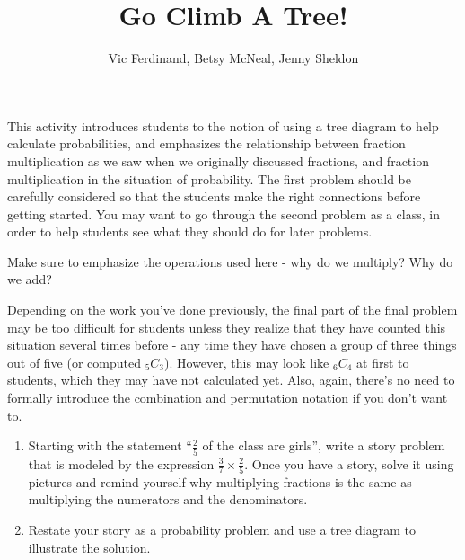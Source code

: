 \documentclass{ximera}
\title{Go Climb A Tree!}
\author{Vic Ferdinand, Betsy McNeal, Jenny Sheldon}
\begin{document}
\begin{abstract}
\end{abstract}
\maketitle

\begin{instructorIntro}
This activity introduces students to the notion of using a tree diagram to help calculate probabilities, and emphasizes the relationship between fraction multiplication as we saw when we originally discussed fractions, and fraction multiplication in the situation of probability.  The first problem should be carefully considered so that the students make the right connections before getting started.  You may want to go through the second problem as a class, in order to help students see what they should do for later problems.

Make sure to emphasize the operations used here - why do we multiply?  Why do we add?

Depending on the work you've done previously, the final part of the final problem may be too difficult for students unless they realize that they have counted this situation several times before - any time they have chosen a group of three things out of five (or computed $_5C_3$).  However, this may look like $_6C_4$ at first to students, which they may have not calculated yet.  Also, again, there's no need to formally introduce the combination and permutation notation if you don't want to.

\end{instructorIntro}

\begin{problem}
\begin{enumerate}
\item Starting with the statement ``$\frac25$ of the class are girls'', write a story problem that is modeled by the expression $\frac37 \times \frac25$.  Once you have a story, solve it using pictures and remind yourself why multiplying fractions is the same as multiplying the numerators and the denominators.
\item Restate your story as a probability problem and use a tree diagram to illustrate the solution.
\end{enumerate}
\end{problem}
\end{document}
